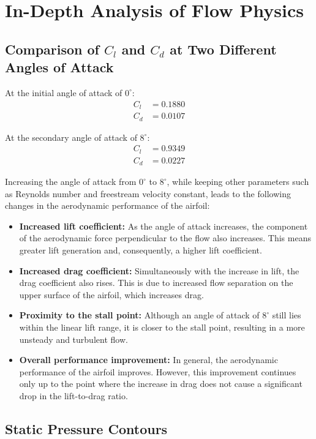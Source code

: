 \documentclass[12pt,a4paper]{article}
\begin{document}
\section{In-Depth Analysis of Flow Physics}

\subsection{Comparison of $C_l$ and $C_d$ at Two Different Angles of Attack}

At the initial angle of attack of $0^\circ$:
\begin{align*}
C_l &= 0.1880 \\
C_d &= 0.0107
\end{align*}

At the secondary angle of attack of $8^\circ$:
\begin{align*}
C_l &= 0.9349 \\
C_d &= 0.0227
\end{align*}

Increasing the angle of attack from $0^\circ$ to $8^\circ$, while keeping other parameters such as Reynolds number and freestream velocity constant, leads to the following changes in the aerodynamic performance of the airfoil:

\begin{itemize}
    \item \textbf{Increased lift coefficient:} As the angle of attack increases, the component of the aerodynamic force perpendicular to the flow also increases. This means greater lift generation and, consequently, a higher lift coefficient.
    \item \textbf{Increased drag coefficient:} Simultaneously with the increase in lift, the drag coefficient also rises. This is due to increased flow separation on the upper surface of the airfoil, which increases drag.
    \item \textbf{Proximity to the stall point:} Although an angle of attack of $8^\circ$ still lies within the linear lift range, it is closer to the stall point, resulting in a more unsteady and turbulent flow.
    \item \textbf{Overall performance improvement:} In general, the aerodynamic performance of the airfoil improves. However, this improvement continues only up to the point where the increase in drag does not cause a significant drop in the lift-to-drag ratio.
\end{itemize}

\subsection{Static Pressure Contours}
\end{document}
